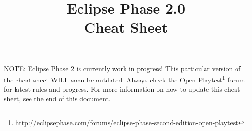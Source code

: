 \documentclass{article}
\title{Eclipse Phase 2.0\\\small{Cheat Sheet}}
\begin{document}
\maketitle


\begin{warning}
NOTE: Eclipse Phase 2 is currently work in progress! This particular version of the
cheat sheet WILL soon be outdated. Always check the Open Playtest\footnote{\url{http://eclipsephase.com/forums/eclipse-phase-second-edition-open-playtest}}
forum for latest rules and progress. For more information on
how to update this cheat sheet, see the end of this document.
\end{warning}












\end{document}
